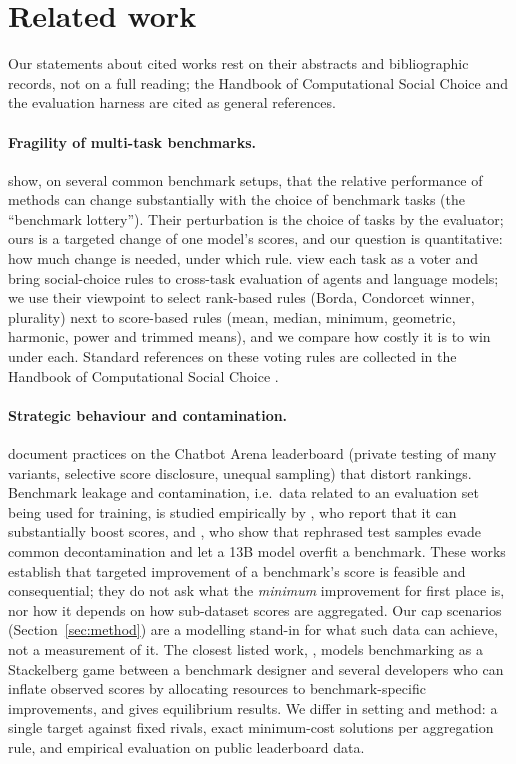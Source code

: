 \section{Related work}
\label{sec:related}

Our statements about cited works rest on their abstracts and bibliographic records, not on a full reading; the Handbook of Computational Social Choice and the evaluation harness are cited as general references.

\paragraph{Fragility of multi-task benchmarks.}
\citet{dehghani2021benchmark} show, on several common benchmark setups, that the relative performance of methods
can change substantially with the choice of benchmark tasks (the ``benchmark lottery'').
Their perturbation is the choice of tasks by the evaluator; ours is a targeted change of one model's scores,
and our question is quantitative: how much change is needed, under which rule.
\citet{lanctot2023evaluating} view each task as a voter and bring social-choice rules to cross-task evaluation of agents and language models;
we use their viewpoint to select rank-based rules (Borda, Condorcet winner, plurality) next to score-based rules
(mean, median, minimum, geometric, harmonic, power and trimmed means), and we compare how costly it is to win under each.
Standard references on these voting rules are collected in the Handbook of Computational Social Choice \citep{brandt2016handbook}.

\paragraph{Strategic behaviour and contamination.}
\citet{singh2025leaderboard} document practices on the Chatbot Arena leaderboard (private testing of many variants, selective score disclosure, unequal sampling)
that distort rankings. Benchmark leakage and contamination, i.e.\ data related to an evaluation set being used for training,
is studied empirically by \citet{zhou2023dont}, who report that it can substantially boost scores,
and \citet{yang2023rethinking}, who show that rephrased test samples evade common decontamination and let a 13B model overfit a benchmark.
These works establish that targeted improvement of a benchmark's score is feasible and consequential;
they do not ask what the \emph{minimum} improvement for first place is, nor how it depends on how sub-dataset scores are aggregated.
Our cap scenarios (Section~\ref{sec:method}) are a modelling stand-in for what such data can achieve, not a measurement of it.
The closest listed work, \citet{chen2026leaderboard}, models benchmarking as a Stackelberg game between a benchmark designer and several developers
who can inflate observed scores by allocating resources to benchmark-specific improvements, and gives equilibrium results.
We differ in setting and method: a single target against fixed rivals, exact minimum-cost solutions per aggregation rule,
and empirical evaluation on public leaderboard data.

